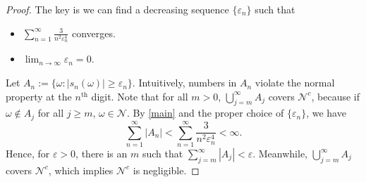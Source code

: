 \documentclass[12pt]{article}
\newcommand\nn{\mathcal{N}}
\newcommand\eps{\varepsilon}
\begin{document}
\begin{proof}
    The key is we can find a decreasing sequence $\{\eps_n\}$ such that 
    \begin{itemize}
        \item $\sum_{n = 1}^\infty \frac{3}{n^2\eps_n^4}$ converges. 
        \item $\lim_{n \to \infty} \eps_n= 0$.
    \end{itemize}
    Let $A_n := \{\omega : |s_n(\omega)| \geq \eps_n\}$.
    Intuitively, numbers in $A_n$ violate the normal property at the $n^{\text{th}}$ digit.
    Note that for all $m > 0$, $\bigcup_{j = m}^\infty A_j$ covers $\nn^c$, 
    because if $\omega \notin A_j$ for all $j \geq m$, $\omega \in \nn$.
    By \cref{main} and the proper choice of $\{\eps_n\}$, we have
    \begin{equation}
        \sum_{n=1}^\infty |A_n| < \sum_{n=1}^\infty \frac{3}{n^2\eps_n^4} < \infty.
    \end{equation}
    Hence, for $\eps > 0$, 
    there is an $m$ such that $\sum_{j = m}^\infty |A_j| < \eps$.
    Meanwhile, $\bigcup_{j = m}^\infty A_j$ covers $\nn^c$, 
    which implies $\nn^c$ is negligible.
\end{proof}
\end{document}
